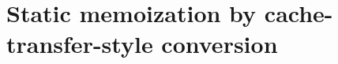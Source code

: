 \chapter{Static memoization by cache-transfer-style conversion}
\label{ch:cts}
\newcommand{\poplPath}[1]{popl18/#1}






